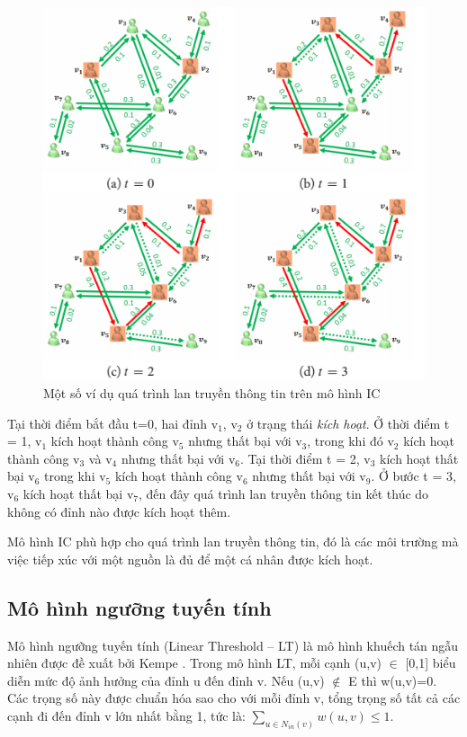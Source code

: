 		\begin{center}
			\begin{figure}[H]
				\begin{center}
					\includegraphics [scale=1]{picture/Hinh2_1}
				\end{center}
				\caption{Một số ví dụ quá trình lan truyền thông tin trên mô hình IC}
				\label{refhinh2_1}
			\end{figure}
		\end{center}
	Tại thời điểm bắt đầu t=0, hai đỉnh v$_{1}$, v$_{2}$ ở trạng thái {\itshape kích hoạt}. Ở thời điểm t = 1, v$_{1}$ kích hoạt thành công v$_{5}$ nhưng thất bại với v$_{3}$, trong khi đó v$_{2}$ kích hoạt thành công v$_{3}$ và v$_{4}$ nhưng thất bại với v$_{6}$. Tại thời điểm t = 2, v$_{3}$ kích hoạt thất bại v$_{6}$ trong khi v$_{5}$ kích hoạt thành công v$_{6}$ nhưng thất bại với v$_{9}$. Ở bước t = 3, v$_{6}$ kích hoạt thất bại v$_{7}$, đến đây quá trình lan truyền thông tin kết thúc do không có đỉnh nào được kích hoạt thêm.
	
	Mô hình IC phù hợp cho quá trình lan truyền thông tin, đó là các môi trường mà việc tiếp xúc với một nguồn là đủ để một cá nhân được kích hoạt.
	
	\subsection{Mô hình ngưỡng tuyến tính}
	Mô hình ngưỡng tuyến tính (Linear Threshold – LT) là mô hình khuếch tán ngẫu nhiên được đề xuất bởi Kempe \cite{kemple1}. Trong mô hình LT, mỗi cạnh (u,v) $\in$ [0,1] biểu diễn mức độ ảnh hưởng của đỉnh u đến đỉnh v. Nếu (u,v) $\notin$ E thì w(u,v)=0. Các trọng số này được chuẩn hóa sao cho với mỗi đỉnh v, tổng trọng số tất cả các cạnh đi đến đỉnh v lớn nhất bằng 1, tức là: $\sum_{u\in N_{in}(v)}w(u,v) \leq 1.$ 
	
